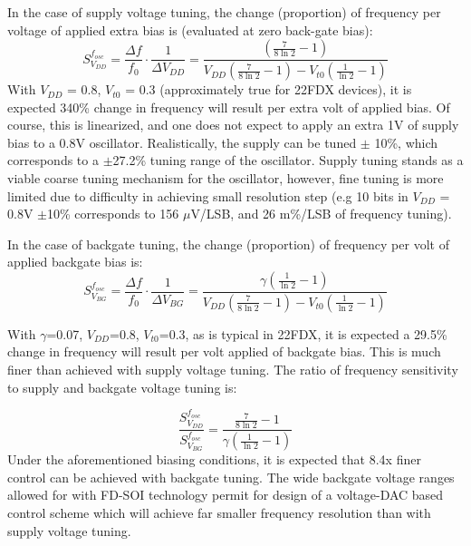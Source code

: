 		In the case of supply voltage tuning, the change (proportion) of frequency per voltage of applied extra bias is (evaluated at zero back-gate bias):
		\begin{equation}
			S^{f_{osc}}_{V_{DD}} = \frac{\Delta f}{f_0}\cdot\frac{1}{\Delta V_{DD}}  = \frac{\left(\frac{7}{8\ln2}-1\right)}{V_{DD}\left(\frac{7}{8\ln2}-1\right)-V_{t0}\left(\frac{1}{\ln2}-1\right)}
		\end{equation}
		With $V_{DD}$ = 0.8, $V_{t0}$ = 0.3 (approximately true for 22FDX devices), it is expected 340\% change in frequency will result per extra volt of applied bias. Of course, this is linearized, and one does not expect to apply an extra 1V of supply bias to a 0.8V oscillator. Realistically, the supply can be tuned $\pm$ 10\%, which corresponds to a $\pm$27.2\% tuning range of the oscillator. Supply tuning stands as a viable coarse tuning mechanism for the oscillator, however, fine tuning is more limited due to difficulty in achieving small resolution step (e.g 10 bits in $V_{DD}$ = 0.8V $\pm$10\% corresponds to 156 $\mu$V/LSB, and 26 m\%/LSB of frequency tuning).

		\par In the case of backgate tuning, the change (proportion) of frequency per volt of applied backgate bias is:
		\begin{equation}
			S^{f_{osc}}_{V_{BG}} = \frac{\Delta f}{f_0}\cdot\frac{1}{\Delta V_{BG}}  = \frac{\gamma \left(\frac{1}{\ln2}-1\right)}{V_{DD}\left(\frac{7}{8\ln2}-1\right)-V_{t0}\left(\frac{1}{\ln2}-1\right)}
		\end{equation}

		With $\gamma$=0.07, $V_{DD}$=0.8, $V_{t0}$=0.3, as is typical in 22FDX, it is expected a 29.5\% change in frequency will result per volt applied of backgate bias. This is much finer than achieved with supply voltage tuning. The ratio of frequency sensitivity to supply and backgate voltage tuning is:

		\begin{equation}
			\frac{S^{f_{osc}}_{V_{DD}}}{S^{f_{osc}}_{V_{BG}}} =  \frac{\frac{7}{8\ln2}-1}{\gamma \left(\frac{1}{\ln2}-1\right)}
		\end{equation}
		Under the aforementioned biasing conditions, it is expected that 8.4x finer control can be achieved with backgate tuning. The wide backgate voltage ranges allowed for with FD-SOI technology permit for design of a voltage-DAC based control scheme which will achieve far smaller frequency resolution than with supply voltage tuning. 

